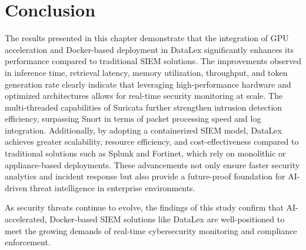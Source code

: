 \section{Conclusion}
\label{sec_conclusion_performance}

The results presented in this chapter demonstrate that the integration of GPU acceleration and Docker-based deployment in DataLex significantly enhances its performance compared to traditional SIEM solutions. The improvements observed in inference time, retrieval latency, memory utilization, throughput, and token generation rate clearly indicate that leveraging high-performance hardware and optimized architectures allows for real-time security monitoring at scale. The multi-threaded capabilities of Suricata further strengthen intrusion detection efficiency, surpassing Snort in terms of packet processing speed and log integration. Additionally, by adopting a containerized SIEM model, DataLex achieves greater scalability, resource efficiency, and cost-effectiveness compared to traditional solutions such as Splunk and Fortinet, which rely on monolithic or appliance-based deployments. These advancements not only ensure faster security analytics and incident response but also provide a future-proof foundation for AI-driven threat intelligence in enterprise environments.

As security threats continue to evolve, the findings of this study confirm that AI-accelerated, Docker-based SIEM solutions like DataLex are well-positioned to meet the growing demands of real-time cybersecurity monitoring and compliance enforcement.
